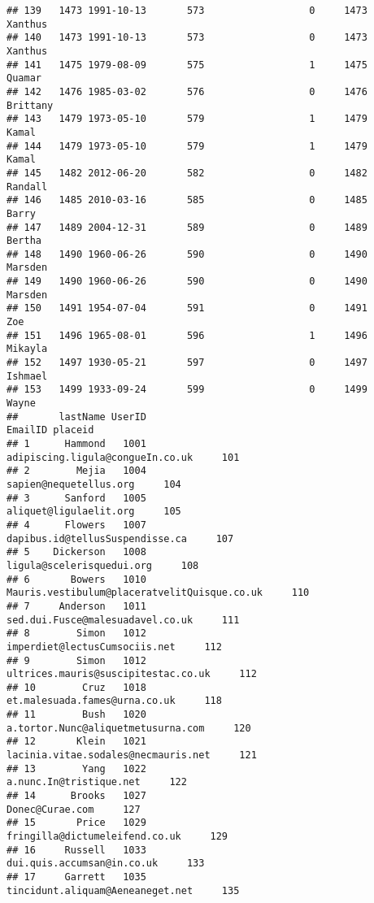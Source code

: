 \documentclass[
]{article}
\begin{document}
\begin{verbatim}
## 139   1473 1991-10-13       573                  0     1473    Xanthus
## 140   1473 1991-10-13       573                  0     1473    Xanthus
## 141   1475 1979-08-09       575                  1     1475     Quamar
## 142   1476 1985-03-02       576                  0     1476   Brittany
## 143   1479 1973-05-10       579                  1     1479      Kamal
## 144   1479 1973-05-10       579                  1     1479      Kamal
## 145   1482 2012-06-20       582                  0     1482    Randall
## 146   1485 2010-03-16       585                  0     1485      Barry
## 147   1489 2004-12-31       589                  0     1489     Bertha
## 148   1490 1960-06-26       590                  0     1490    Marsden
## 149   1490 1960-06-26       590                  0     1490    Marsden
## 150   1491 1954-07-04       591                  0     1491        Zoe
## 151   1496 1965-08-01       596                  1     1496    Mikayla
## 152   1497 1930-05-21       597                  0     1497    Ishmael
## 153   1499 1933-09-24       599                  0     1499      Wayne
##       lastName UserID                                           EmailID placeid
## 1      Hammond   1001                  adipiscing.ligula@congueIn.co.uk     101
## 2        Mejia   1004                            sapien@nequetellus.org     104
## 3      Sanford   1005                            aliquet@ligulaelit.org     105
## 4      Flowers   1007                   dapibus.id@tellusSuspendisse.ca     107
## 5    Dickerson   1008                         ligula@scelerisquedui.org     108
## 6       Bowers   1010      Mauris.vestibulum@placeratvelitQuisque.co.uk     110
## 7     Anderson   1011                  sed.dui.Fusce@malesuadavel.co.uk     111
## 8        Simon   1012                     imperdiet@lectusCumsociis.net     112
## 9        Simon   1012               ultrices.mauris@suscipitestac.co.uk     112
## 10        Cruz   1018                     et.malesuada.fames@urna.co.uk     118
## 11        Bush   1020                a.tortor.Nunc@aliquetmetusurna.com     120
## 12       Klein   1021               lacinia.vitae.sodales@necmauris.net     121
## 13        Yang   1022                           a.nunc.In@tristique.net     122
## 14      Brooks   1027                                   Donec@Curae.com     127
## 15       Price   1029                    fringilla@dictumeleifend.co.uk     129
## 16     Russell   1033                        dui.quis.accumsan@in.co.uk     133
## 17     Garrett   1035                  tincidunt.aliquam@Aeneaneget.net     135

\end{verbatim}
\end{document}
